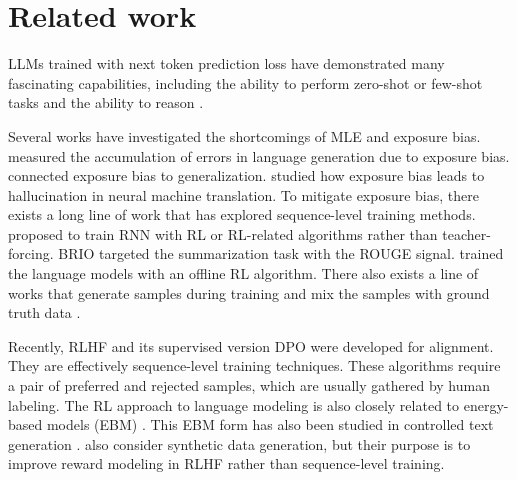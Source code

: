 \section{Related work}
LLMs trained with next token prediction loss \citep{radford2019language,chung2022scaling,sanh2021multitask,zhou2023lima} have demonstrated many fascinating capabilities, including the ability to perform zero-shot or few-shot tasks \citep{radford2019language,brown2020language} and the ability to reason \citep{wei2022chain}. 

Several works have investigated the shortcomings of MLE and exposure bias. \citet{arora2022exposure} measured the accumulation of errors in language generation due to exposure bias. \citet{schmidt2019generalization} connected exposure bias to generalization. \citet{wang2020exposure} studied how exposure bias leads to hallucination in neural machine translation. To mitigate exposure bias, there exists a long line of work that has explored sequence-level training methods. \citet{bengio2015scheduled,ranzato2015sequence} proposed to train RNN with RL or RL-related algorithms rather than teacher-forcing. BRIO \citet{liu2022brio} targeted the summarization task with the ROUGE signal. \citet{pang2020text} trained the language models with an offline RL algorithm. There also exists a line of works that generate samples during training and mix the samples with ground truth data \citep{shen2015minimum,zhang2019bridging,duckworth2019parallel}. 

Recently, RLHF \citep{stiennon2020learning,ouyang2022training} and its supervised version DPO \citep{rafailov2023direct} were developed for alignment. They are effectively sequence-level training techniques. These algorithms require a pair of preferred and rejected samples, which are usually gathered by human labeling. The RL approach to language modeling is also closely related to energy-based models (EBM) \citep{korbak2022rl, deng2020residual}. This EBM form has also been studied in controlled text generation \citet{kumar2022gradient}. \citet{pace2024west} also consider synthetic data generation, but their purpose is to improve reward modeling in RLHF rather than sequence-level training. 
